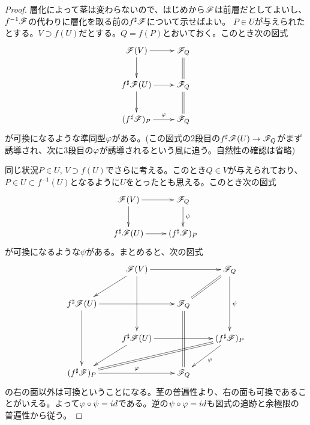 \begin{proof}
  層化によって茎は変わらないので、はじめから$\mathscr{F}$は前層だとしてよいし、$f^{-1}\mathscr{F}$の代わりに層化を取る前の$f^{\sharp}\mathscr{F}$について示せばよい。
  $P \in U$が与えられたとする。$V \supset f(U)$だとする。$Q = f(P)$とおいておく。このとき次の図式
\[
\xymatrix{
\scrf(V) \ar[r] \ar[d] & \scrf_Q \ar@{=}[d] \\
f^{\sh}\scrf(U) \ar[d] \ar[r] & \scrf_Q \ar@{=}[d] \\
(f^{\sh}\scrf)_P \ar[r]^-{\vp} & \scrf_Q
}
\]
  が可換になるような準同型${\varphi}$がある。(この図式の2段目の$f^{\sharp}\mathscr{F}(U) \to \mathscr{F}_Q$がまず誘導され、次に3段目の${\varphi}$が誘導されるという風に追う。自然性の確認は省略)

  同じ状況$P \in U$, $V \supset f(U)$でさらに考える。このとき$Q \in V$が与えられており、$P \in U \subset f^{-1}(U)$となるように$U$をとったとも思える。このとき次の図式
  \[
  \xymatrix{
  \scrf(V) \ar[d] \ar[r] & \scrf_Q \ar[d]^-{\psi} \\
f^{\sh}\scrf(U) \ar[r] & (f^{\sh}\scrf)_P
  }
  \]
  が可換になるような$\psi$がある。まとめると、次の図式
  \[
  \xymatrix{
  {}  & \scrf(V) \ar[rr] \ar[ld] \ar[dd] & {} & \scrf_Q \ar@{=}[ld] \ar[dd]^-{\psi} \\
  f^{\sh}\scrf(U) \ar[dd]  \ar[rr] & { } & \scrf_Q \ar@{=}[dd] & {} \\
  {} & f^{\sh}\scrf(U)  \ar[rr] \ar[dl] & { } & (f^{\sh}\scrf )_P \ar@{=}[dlll] \ar[dl]^-{\vp} \\
   (f^{\sh}\scrf )_P  \ar[rr]^-{\vp}  & {} & \scrf_Q & {}
  }
  \]
  の右の面以外は可換ということになる。茎の普遍性より、右の面も可換であることがいえる。よって${\varphi} \circ \psi = id$である。逆の$\psi \circ {\varphi} = id$も図式の追跡と余極限の普遍性から従う。
\end{proof}






